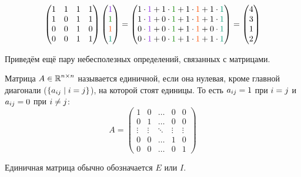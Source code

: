 \documentclass[a4paper,12pt]{article}
\begin{document}
  \begin{solution}
    \[
      \begin{pmatrix}
        1 & 1 & 1 & 1\\
        1 & 0 & 1 & 1\\
        0 & 0 & 1 & 0\\
        0 & 0 & 1 & 1
      \end{pmatrix}
      \begin{pmatrix}
        \textcolor{light-purple}{1} \\ \textcolor{my-green}{1} \\ \textcolor{my-orange}{1} \\ \textcolor{my-cyan}{1}
      \end{pmatrix}
      = \begin{pmatrix}
        1 \cdot \textcolor{light-purple}{1} + 1 \cdot \textcolor{my-green}{1} + 1 \cdot \textcolor{my-orange}{1} + 1 \cdot \textcolor{my-cyan}{1}\\
        1 \cdot \textcolor{light-purple}{1} + 0 \cdot \textcolor{my-green}{1} + 1 \cdot \textcolor{my-orange}{1} + 1 \cdot \textcolor{my-cyan}{1}\\
        0 \cdot \textcolor{light-purple}{1} + 0 \cdot \textcolor{my-green}{1} + 1 \cdot \textcolor{my-orange}{1} + 0 \cdot \textcolor{my-cyan}{1}\\
        0 \cdot \textcolor{light-purple}{1} + 0 \cdot \textcolor{my-green}{1} + 1 \cdot \textcolor{my-orange}{1} + 1 \cdot \textcolor{my-cyan}{1}\\
      \end{pmatrix}
      = \begin{pmatrix}
        4 \\ 3 \\ 1 \\ 2
      \end{pmatrix}
    \]
  \end{solution}
  
  
  Приведём ещё пару небесполезных определений, связанных с матрицами.
  
  \begin{definition}
    Матрица $A \in \operatorname{\mathbb R}^{n \times n}$ называется единичной, если она нулевая, кроме главной диагонали ($\{a_{ij} \hm\mid i \hm= j\}$), на которой стоят единицы.
    То есть $a_{ij} \hm= 1$ при $i \hm= j$ и $a_{ij} \hm= 0$ при $i \hm{\not=} j$:
    \[
      A = \begin{pmatrix}
        1      & 0      & \ldots & 0       & 0\\
        0      & 1      & \ldots & 0       & 0\\
        \vdots & \vdots & \ddots & \vdots & \vdots\\
        0      & 0      & \ldots & 1      & 0\\
        0      & 0      & \ldots & 0      & 1
      \end{pmatrix}
    \]
    
    Единичная матрица обычно обозначается $E$ или $I$.
  \end{definition}
  
\end{document}
